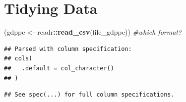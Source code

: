 \documentclass[12pt,]{article}
\newenvironment{Shaded}{\begin{snugshade}}{\end{snugshade}}
\newcommand{\KeywordTok}[1]{\textcolor[rgb]{0.13,0.29,0.53}{\textbf{#1}}}
\newcommand{\StringTok}[1]{\textcolor[rgb]{0.31,0.60,0.02}{#1}}
\newcommand{\CommentTok}[1]{\textcolor[rgb]{0.56,0.35,0.01}{\textit{#1}}}
\newcommand{\OperatorTok}[1]{\textcolor[rgb]{0.81,0.36,0.00}{\textbf{#1}}}
\newcommand{\NormalTok}[1]{#1}
\begin{document}
\section{Tidying Data}\label{tidying-data}

\begin{Shaded}
\begin{Highlighting}[]
\NormalTok{(gdppc <-}\StringTok{ }\NormalTok{readr}\OperatorTok{::}\KeywordTok{read_csv}\NormalTok{(file_gdppc)) }\CommentTok{#which format?}
\end{Highlighting}
\end{Shaded}

\begin{verbatim}
## Parsed with column specification:
## cols(
##   .default = col_character()
## )
\end{verbatim}

\begin{verbatim}
## See spec(...) for full column specifications.
\end{verbatim}
\end{document}
